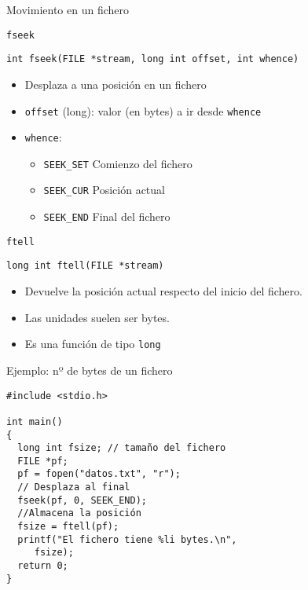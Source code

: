\documentclass[usenames,svgnames,dvipsnames, aspectratio=169]{beamer}
\begin{document}
\begin{frame}[label={sec:org30e6414},fragile,plain]{Movimiento en un fichero}
 \begin{block}{\texttt{fseek}}
\lstset{language=C,label= ,caption= ,captionpos=b,numbers=none}
\begin{lstlisting}
int fseek(FILE *stream, long int offset, int whence)
\end{lstlisting}

\begin{itemize}
\item Desplaza a una posición en un fichero
\item \texttt{offset} (long): valor (en bytes) a ir desde \texttt{whence}
\item \texttt{whence}:
\begin{itemize}
\item \texttt{SEEK\_SET} Comienzo del fichero
\item \texttt{SEEK\_CUR} Posición actual
\item \texttt{SEEK\_END} Final del fichero
\end{itemize}
\end{itemize}
\end{block}

\begin{block}{\texttt{ftell}}
\lstset{language=C,label= ,caption= ,captionpos=b,numbers=none}
\begin{lstlisting}
long int ftell(FILE *stream)
\end{lstlisting}

\begin{itemize}
\item Devuelve la posición actual respecto del inicio del fichero.
\item Las unidades suelen ser \alert{bytes}.
\item Es una función de tipo \texttt{long}
\end{itemize}
\end{block}
\end{frame}

\begin{frame}[label={sec:org6cc4565},fragile]{Ejemplo: nº de bytes de un fichero}
 \lstset{language=C,label= ,caption= ,captionpos=b,numbers=none}
\begin{lstlisting}
#include <stdio.h>

int main()
{
  long int fsize; // tamaño del fichero
  FILE *pf;
  pf = fopen("datos.txt", "r");
  // Desplaza al final
  fseek(pf, 0, SEEK_END);
  //Almacena la posición
  fsize = ftell(pf);
  printf("El fichero tiene %li bytes.\n",
	 fsize);
  return 0;
}
\end{lstlisting}
\end{frame}
\end{document}
